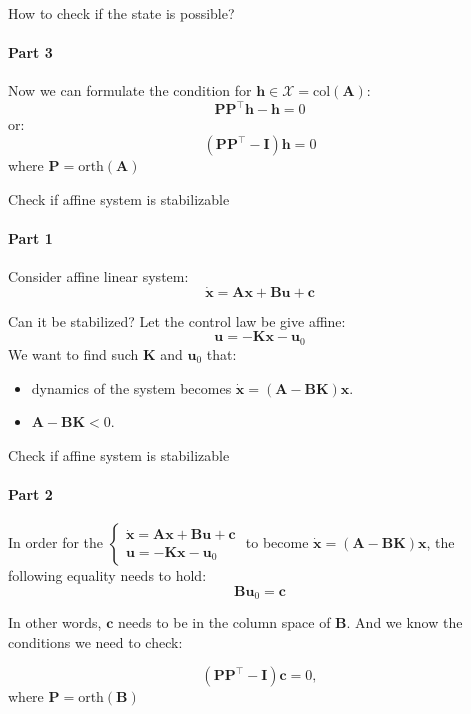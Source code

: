 \documentclass{beamer}
\begin{document}
\begin{frame}{How to check if the state is possible?}
\framesubtitle{Part 3}
\begin{flushleft}

Now we can formulate the condition for $\mathbf h \in \mathcal{X} = \text{col} (\mathbf A)$:
\[
\mathbf P \mathbf P^\top \mathbf h - \mathbf h = 0
\]
or:
\[
(\mathbf P \mathbf P^\top - \mathbf I) \mathbf h = 0
\]
where $\mathbf P = \text{orth} (\mathbf A)$

\end{flushleft}
\end{frame}




\begin{frame}{Check if affine system is stabilizable}
\framesubtitle{Part 1}
\begin{flushleft}

Consider affine linear system:
\begin{equation}
\label{eq:Affine}
    \dot{\mathbf x} = \mathbf A \mathbf x + \mathbf B \mathbf u + \mathbf c
\end{equation}

Can it be stabilized? Let the control law be give affine:
\[
\mathbf u = -\mathbf K \mathbf x - \mathbf u_0
\]
We want to find such $\mathbf K$ and $\mathbf u_0$ that:

\begin{itemize}
    \item dynamics of the system becomes $\dot{\mathbf x} =  (\mathbf A - \mathbf B \mathbf K) \mathbf x$.
    \item $\mathbf A - \mathbf B \mathbf K < 0$.
\end{itemize}

\end{flushleft}
\end{frame}



\begin{frame}{Check if affine system is stabilizable}
\framesubtitle{Part 2}
\begin{flushleft}

In order for the 
$\begin{cases}
    \dot{\mathbf x} = \mathbf A \mathbf x + \mathbf B \mathbf u + \mathbf c \\
    \mathbf u = -\mathbf K \mathbf x - \mathbf u_0
\end{cases}$
to become
$\dot{\mathbf x} =  (\mathbf A - \mathbf B \mathbf K) \mathbf x$,
the following equality needs to hold:
\[
\mathbf B \mathbf u_0 = \mathbf c
\]

In other words, $\mathbf c$ needs to be in the column space of $\mathbf B$. And we know the conditions we need to check:

\[
(\mathbf P \mathbf P^\top - \mathbf I) \mathbf c = 0,
\]
where $\mathbf P = \text{orth} (\mathbf B)$

\end{flushleft}
\end{frame}
\end{document}
